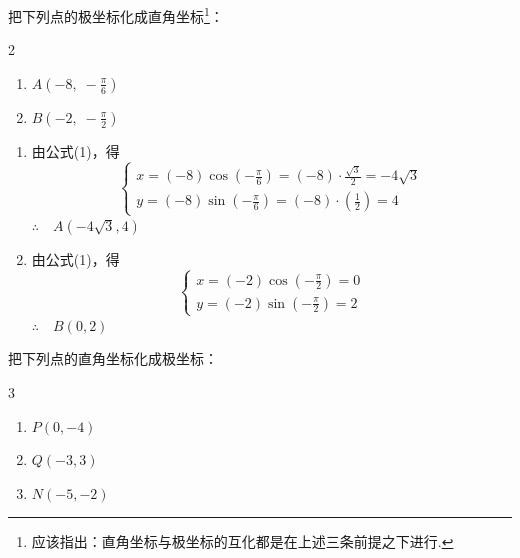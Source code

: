 \begin{example}
    把下列点的极坐标化成直角坐标\footnote{应该指出：直角坐标与极坐标的互化都是在上述三条前提之下进行.}：
\begin{multicols}{2}
\begin{enumerate}[(1)]
    \item $A\left(-8,\; -\frac{\pi}{6}\right)$
    \item $B\left(-2,\; -\frac{\pi}{2}\right)$
\end{enumerate}
\end{multicols}
\end{example}

\begin{solution}
\begin{enumerate}[(1)]
    \item 由公式(1)，得
\[\begin{cases}
    x=(-8)\cos\left(-\frac{\pi}{6}\right)=(-8)\cdot \frac{\sqrt{3}}{2}=-4\sqrt{3}\\[1.5ex]
    y=(-8)\sin\left(-\frac{\pi}{6}\right)=(-8)\cdot \left(\frac{1}{2}\right)=4
\end{cases}\]
$\therefore\quad A\left(-4\sqrt{3},4\right)$
    \item 由公式(1)，得
\[\begin{cases}
    x=(-2)\cos\left(-\frac{\pi}{2}\right)=0\\[1.5ex]
    y=(-2)\sin\left(-\frac{\pi}{2}\right)=2
\end{cases}\]
$\therefore\quad B\left(0,2\right)$
\end{enumerate}
\end{solution}

\begin{example}
    把下列点的直角坐标化成极坐标：
\begin{multicols}{3}
\begin{enumerate}[(1)]
    \item $P(0,-4)$
    \item $Q(-3,3)$
    \item $N(-5,-2)$
\end{enumerate}
\end{multicols}
\end{example}


